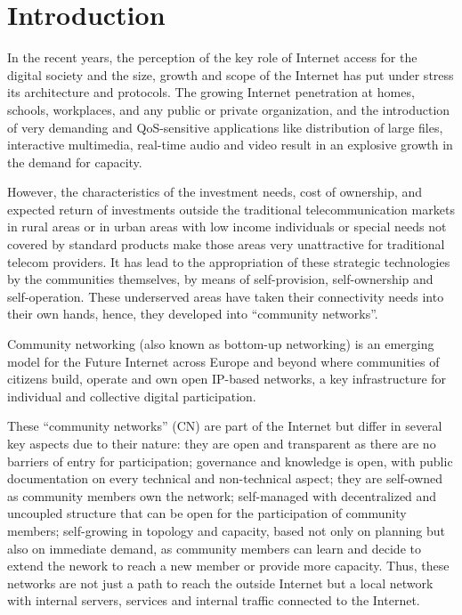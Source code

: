 \documentclass[conference]{IEEEtran}
\begin{document}
\section{Introduction}

In the recent years, the perception of the key role of Internet access for the
digital society and the size, growth and scope of the Internet has put under stress
its architecture and protocols. The growing Internet penetration at homes, schools,
workplaces, and any public or private organization, and the introduction of very demanding
and QoS-sensitive applications like distribution of large files, interactive multimedia,
real-time audio and video result in an explosive growth in the demand for capacity.

However, the characteristics of the investment needs, cost of ownership, and expected return
of investments outside the traditional telecommunication markets in rural areas or in 
urban areas with low income individuals or special needs not covered by standard products
make those areas very unattractive for traditional telecom providers. It has lead to the
appropriation of these strategic technologies by the communities themselves, by means of
self-provision, self-ownership and self-operation. These underserved areas have taken their
connectivity needs into their own hands, hence, they developed into ``community networks''.

Community networking (also known as bottom-up networking) is an emerging model 
for the Future Internet across Europe and beyond where communities
of citizens build, operate and own open IP-based networks, a key infrastructure
for individual and collective digital participation.

These ``community networks'' (CN) are part of the Internet but differ in several key
aspects due to their nature: they are open and transparent as there are no barriers of entry
for participation; governance and knowledge is open, with public documentation on
every technical and non-technical aspect; they are self-owned as community members
own the network; self-managed with decentralized and uncoupled structure that can be open
for the participation of community members; self-growing in topology and capacity, based not only
on planning but also on immediate demand, as community members can learn and decide to extend the nework
to reach a new member or provide more capacity. Thus, these networks are not just
a path to reach the outside Internet but a local network with internal servers, services and
internal traffic connected to the Internet.
\end{document}
